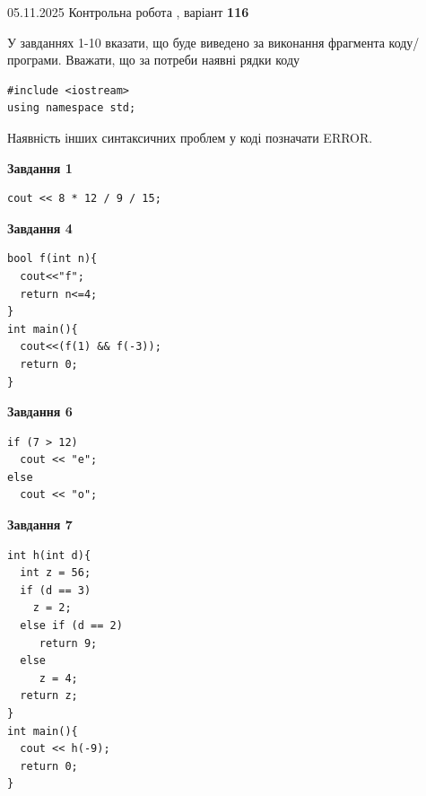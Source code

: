 \documentclass[12pt, ukrainian]{article}
\begin{document}
\newpage

{\Large{05.11.2025 Контрольна робота , варіант  \No \textbf { 116 }\par}}
{
\begin {large}
У завданнях 1-10 вказати, що буде виведено за виконання фрагмента коду/про\-гра\-ми.
Вважати, що за потреби наявні рядки коду
\begin{verbatim}
#include <iostream>
using namespace std;
\end{verbatim}
Наявність інших синтаксичних проблем у коді позначати ERROR.

\begin{minipage}[t]{7.0cm}

\begin{center}
\textbf{Завдання 1}
\end{center}
\vspace{-8mm}

\begin{verbatim}
cout << 8 * 12 / 9 / 15;
\end{verbatim}



\begin{center}
\textbf{Завдання 4}
\end{center}
\vspace{-8mm}

\begin{verbatim}
bool f(int n){
  cout<<"f";
  return n<=4;
}
int main(){
  cout<<(f(1) && f(-3));
  return 0;
}
\end{verbatim}



\begin{center}
\textbf{Завдання 6}
\end{center}
\vspace{-8mm}

\begin{verbatim}
if (7 > 12)
  cout << "e";
else
  cout << "o";
\end{verbatim}



\begin{center}
\textbf{Завдання 7}
\end{center}
\vspace{-8mm}

\begin{verbatim}
int h(int d){
  int z = 56;
  if (d == 3)
    z = 2;
  else if (d == 2)
     return 9;
  else
     z = 4;
  return z;
}
int main(){
  cout << h(-9);
  return 0;
}
\end{verbatim}


\end{minipage}
\end{large}}
\end{document}
